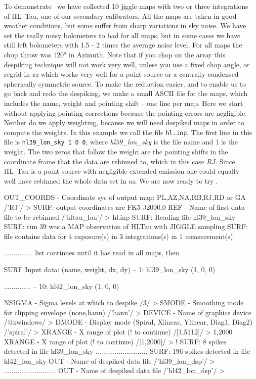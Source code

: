 \documentclass[twoside,11pt,noabs]{starlink}
\providecommand{\task}[1]{\textsf{#1}}
\providecommand{\desp}{\xref{\task{despike}}{sun216}{DESPIKE}}
\begin{document}
To demonstrate \desp\ we have collected 10 jiggle maps with two or
three integrations of HL~Tau, one of our secondary calibrators.  All
the maps are taken in good weather conditions, but some suffer from
sharp variations in sky noise. We have set the really noisy bolometers
to bad for all maps, but in some cases we have still left bolometers
with 1.5 - 2 times the average noise level.  For all maps the chop
throw was 120" in Azimuth.  Note that if you chop on the array this
despiking technique will not work very well, unless you use a fixed
chop angle, or regrid in \textit{az} which works very well for a point
source or a centrally condensed spherically symmetric source. To make
the reduction easier, and to enable us to go back and redo the
despiking, we make a small ASCII file for the maps, which includes the
name, weight and pointing shift -- one line per map.  Here we start
without applying pointing corrections because the pointing errors are
negligible.  Neither do we apply weighting, because we will need
despiked maps in order to compute the weights.  In this example we
call the file \texttt{hl.inp}.  The first line in this file is
\texttt{hl39\_lon\_sky 1 0 0}, where \textit{hl39\_lon\_sky} is the file
name and 1 is the weight.  The two zeros that follow the weight are
the pointing shifts in the coordinate frame that the data are rebinned
to, which in this case \textit{RJ}. Since HL~Tau is a point source with
negligible extended emission one could equally well have rebinned the
whole data set in \textit{az}. We are now ready to try \desp.

\begin{small}
\begin{terminalv}
OUT_COORDS - Coordinate sys of output map; PL,AZ,NA,RB,RJ,RD or GA
/'RJ'/ >
SURF: output coordinates are FK5 J2000.0
REF - Name of first data file to be rebinned /'hltau_lon'/ > hl.inp
SURF: Reading file hl39_lon_sky
SURF: run 39 was a MAP observation of HLTau with JIGGLE sampling
SURF: file contains data for 4 exposure(s) in 3 integrations(s) in 1
measurement(s)

   ...............   list continues until it has read in all maps,
then

SURF Input data: (name, weight, dx, dy)
   -- 1: hl39_lon_sky (1, 0, 0)

     ..............
   -- 10: hl42_lon_sky (1, 0, 0)

NSIGMA - Sigma levels at which to despike /3/ >
SMODE - Smoothing mode for clipping envelope (none,hann) /'hann'/ >
DEVICE - Name of graphics device /@xwindows/ >
DMODE - Display mode (Spiral, Xlinear, Ylinear, Diag1, Diag2)
/'spiral'/ >
XRANGE - X range of plot (! to continue) /[1,5112]/ > 1,2000
XRANGE - X range of plot (! to continue) /[1,2000]/ > !
SURF: 8 spikes detected in file hl39_lon_sky
...........................
SURF: 196 spikes detected in file hl42_lon_sky
OUT - Name of despiked data file /'hl39_lon_dsp'/ >
...........................
OUT - Name of despiked data file /'hl42_lon_dsp'/ >
\end{terminalv}
\end{small}
\end{document}
